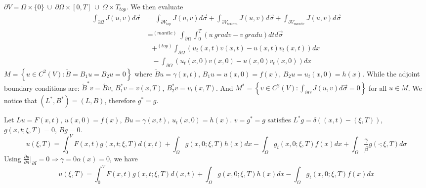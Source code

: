 \documentclass[a4paper, 11pt]{article}
\begin{document}
\begin{spacing}{1.5}
$\partial V = \Omega \times \{0\} \ \cup \ \partial \Omega \times [0,T] \ \cup \ \Omega \times T_{top}$. We then evaluate
\begin{align*}
\int_{\partial \Omega} J(u,v) d \vec{\sigma} 
& = \int_{\partial V_{top}} J(u,v) d \vec{\sigma} + \int_{\partial V_{bottom}} J(u,v) d \vec{\sigma} + \int_{\partial V_{mantle}} J(u,v) d \vec{\sigma} \\
& = ^{(mantle)} \int_{\partial \Omega} \int_{0}^{T} \left( u \ grad v- v \ grad u\right)  dt d\vec{\sigma} \\
& \ \ \ \ + ^{(top)} \int_{\partial \Omega} \left( u_t(x,t)  v(x,t) - u(x,t) v_t(x,t) \right) dx \\
& \ \ \ \ - \int_{\partial \Omega} \left( u_t(x,0) v(x,0) - u(x,0) v_t(x,0)\right) dx
\end{align*}
$
M =\left\lbrace u \in C^2(V) : \tilde{B} = B_1u = B_2u = 0\right\rbrace 
$ where $\tilde{B} u = \gamma(x,t)$, $B_1u = u(x,0) = f(x)$, $B_2u=u_t(x,0) = h(x)$. While the adjoint boundary conditions are: $\tilde{B}^* v = \tilde{B} v$, $B_1^*v = v(x,T)$, $B_2^*v=v_t(x,T)$. And $ M^* =\left\lbrace v \in C^2(V) :\int_{\partial \Omega} J(u,v) d \vec{\sigma} =0 \right\rbrace $
for all $u\in M$. We notice that $(L^*, B^*) = (L,B)$, therefore $g^* =g$.

Let $Lu = F(x,t)$, $u(x,0) = f(x)$, $Bu= \gamma(x,t)$, $u_t(x,0) = h(x)$. $v=g^*=g$ satisfies $L^*g = \delta \left( (x,t) - (\xi,T) \right)$, $g(x,t;\xi,T) =0 $, $Bg=0$.
$$
    u(\xi,T) = \int_{0}^{V} F(x,t) g(x,t;\xi,T) d(x,t) + \int_{\Omega} g(x,0;\xi,T) h(x) dx - \int_{\Omega}g_t(x,0;\xi,T) f(x) dx + \int_{\Omega} \frac{\gamma}{\beta} g(\cdot;\xi,T) d\sigma
$$
Using $\frac{\partial u }{\partial n} \Big|_{\partial I} =0 \Rightarrow \gamma =0 \alpha(x) =0$, we have
$$
    u(\xi,T) = \int_{0}^{V} F(x,t) g(x,t;\xi,T) d(x,t) + \int_{\Omega} g(x,0;\xi,T) h(x) dx - \int_{\Omega}g_t(x,0;\xi,T) f(x) dx
$$


\end{spacing}
\end{document}
